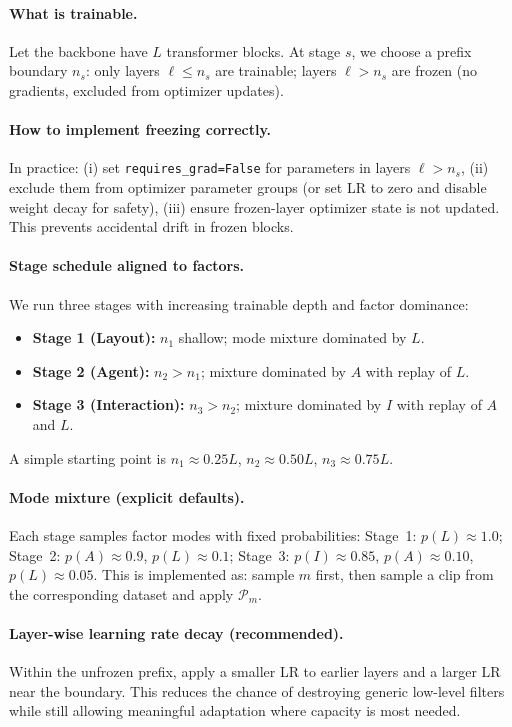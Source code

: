 \paragraph{What is trainable.} Let the backbone have $L$ transformer blocks. At stage $s$, we choose a prefix boundary $n_s$:
only layers $\ell\le n_s$ are trainable; layers $\ell>n_s$ are frozen (no gradients, excluded from optimizer updates).
\paragraph{How to implement freezing correctly.} In practice:
(i) set \texttt{requires\_grad=False} for parameters in layers $\ell>n_s$,
(ii) exclude them from optimizer parameter groups (or set LR to zero and disable weight decay for safety),
(iii) ensure frozen-layer optimizer state is not updated. This prevents accidental drift in frozen blocks.
\paragraph{Stage schedule aligned to factors.} We run three stages with increasing trainable depth and factor dominance:
\begin{itemize}
  \item \textbf{Stage 1 (Layout):} $n_1$ shallow; mode mixture dominated by $L$.
  \item \textbf{Stage 2 (Agent):} $n_2>n_1$; mixture dominated by $A$ with replay of $L$.
  \item \textbf{Stage 3 (Interaction):} $n_3>n_2$; mixture dominated by $I$ with replay of $A$ and $L$.
\end{itemize}
A simple starting point is $n_1\approx 0.25L$, $n_2\approx 0.50L$, $n_3\approx 0.75L$.
\paragraph{Mode mixture (explicit defaults).} Each stage samples factor modes with fixed probabilities:
Stage~1: $p(L)\approx 1.0$;
Stage~2: $p(A)\approx 0.9$, $p(L)\approx 0.1$;
Stage~3: $p(I)\approx 0.85$, $p(A)\approx 0.10$, $p(L)\approx 0.05$.
This is implemented as: sample $m$ first, then sample a clip from the corresponding dataset and apply $\mathcal{P}_m$.
\paragraph{Layer-wise learning rate decay (recommended).} Within the unfrozen prefix, apply a smaller LR to earlier layers and a larger LR near the boundary. This reduces the chance of destroying generic low-level filters while still allowing meaningful adaptation where capacity is most needed.

